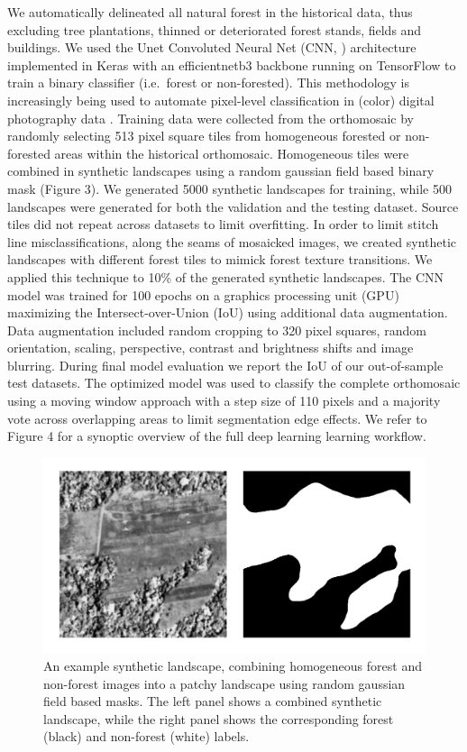 \documentclass[remote sensing,article,submit,moreauthors,pdftex,10pt,a4paper]{mdpi}
\begin{document}
We automatically delineated all natural forest in the historical data,
thus excluding tree plantations, thinned or deteriorated forest stands,
fields and buildings. We used the Unet Convoluted Neural Net (CNN,
\citet{ronneberger2015}) architecture implemented in Keras
\citep{chollet2015} with an efficientnetb3 backbone
\citep{yakubovskiy2019} running on TensorFlow \citep{martinabadi2015} to
train a binary classifier (i.e.~forest or non-forested). This
methodology is increasingly being used to automate pixel-level
classification in (color) digital photography data \citep{buscombe2018}.
Training data were collected from the orthomosaic by randomly selecting
513 pixel square tiles from homogeneous forested or non-forested areas
within the historical orthomosaic. Homogeneous tiles were combined in
synthetic landscapes using a random gaussian field based binary mask
(Figure 3). We generated 5000 synthetic landscapes for training, while
500 landscapes were generated for both the validation and the testing
dataset. Source tiles did not repeat across datasets to limit
overfitting. In order to limit stitch line misclassifications, along the
seams of mosaicked images, we created synthetic landscapes with
different forest tiles to mimick forest texture transitions. We applied
this technique to 10\% of the generated synthetic landscapes. The CNN
model was trained for 100 epochs on a graphics processing unit (GPU)
maximizing the Intersect-over-Union (IoU) using additional data
augmentation. Data augmentation included random cropping to 320 pixel
squares, random orientation, scaling, perspective, contrast and
brightness shifts and image blurring. During final model evaluation we
report the IoU of our out-of-sample test datasets. The optimized model
was used to classify the complete orthomosaic using a moving window
approach with a step size of 110 pixels and a majority vote across
overlapping areas to limit segmentation edge effects. We refer to Figure
4 for a synoptic overview of the full deep learning learning workflow.

\begin{figure}
\includegraphics[width=1\linewidth]{./figures/synthetic_landscape} \caption{An example synthetic landscape, combining homogeneous forest and non-forest images into a patchy landscape using random gaussian field based masks. The left panel shows a combined synthetic landscape, while the right panel shows the corresponding forest (black) and non-forest (white) labels.}\label{fig:unnamed-chunk-3}
\end{figure}
\end{document}
